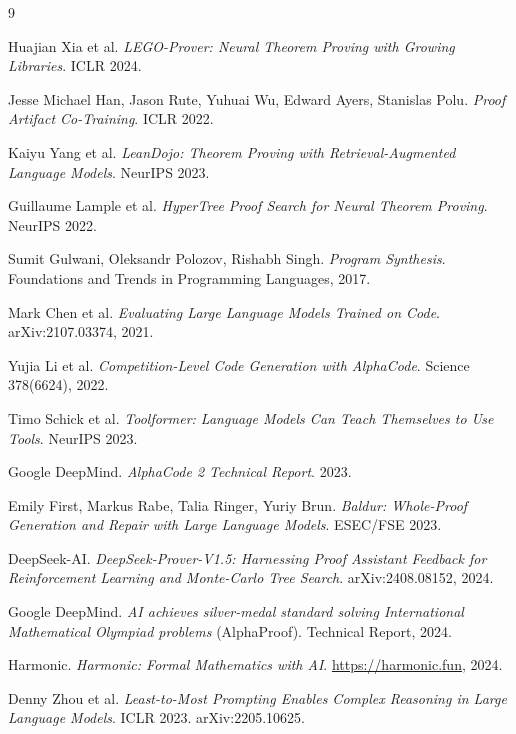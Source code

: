 \documentclass{llncs}
\begin{document}

\begin{thebibliography}{9}

Huajian Xia et al.
\textit{LEGO-Prover: Neural Theorem Proving with Growing Libraries}.
ICLR 2024.

Jesse Michael Han, Jason Rute, Yuhuai Wu, Edward Ayers, Stanislas Polu.
\textit{Proof Artifact Co-Training}.
ICLR 2022.

Kaiyu Yang et al.
\textit{LeanDojo: Theorem Proving with Retrieval-Augmented Language Models}.
NeurIPS 2023.

Guillaume Lample et al.
\textit{HyperTree Proof Search for Neural Theorem Proving}.
NeurIPS 2022.

Sumit Gulwani, Oleksandr Polozov, Rishabh Singh.
\textit{Program Synthesis}.
Foundations and Trends in Programming Languages, 2017.

Mark Chen et al.
\textit{Evaluating Large Language Models Trained on Code}.
arXiv:2107.03374, 2021.

Yujia Li et al.
\textit{Competition-Level Code Generation with AlphaCode}.
Science 378(6624), 2022.

Timo Schick et al.
\textit{Toolformer: Language Models Can Teach Themselves to Use Tools}.
NeurIPS 2023.

Google DeepMind.
\textit{AlphaCode 2 Technical Report}.
2023.

Emily First, Markus Rabe, Talia Ringer, Yuriy Brun.
\textit{Baldur: Whole-Proof Generation and Repair with Large Language Models}.
ESEC/FSE 2023.

DeepSeek-AI.
\textit{DeepSeek-Prover-V1.5: Harnessing Proof Assistant Feedback for
Reinforcement Learning and Monte-Carlo Tree Search}.
arXiv:2408.08152, 2024.

Google DeepMind.
\textit{AI achieves silver-medal standard solving International Mathematical
Olympiad problems} (AlphaProof).
Technical Report, 2024.

Harmonic.
\textit{Harmonic: Formal Mathematics with AI}.
\url{https://harmonic.fun}, 2024.

Denny Zhou et al.
\textit{Least-to-Most Prompting Enables Complex Reasoning in Large Language Models}.
ICLR 2023. arXiv:2205.10625.


\end{thebibliography}
\end{document}
